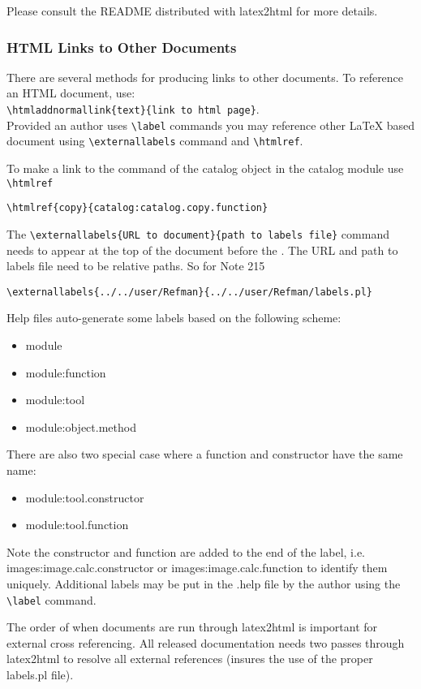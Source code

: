 Please consult the README distributed with latex2html for more details.

\subsubsection{HTML Links to Other Documents}
There are several methods for producing links to other documents.  To
reference an HTML document, use:\\
\verb!\htmladdnormallink{text}{link to html page}!.\\
Provided an author uses
\verb!\label! commands you may reference other 
LaTeX based document using 
\verb!\externallabels! command and \verb!\htmlref!.

To make a link to the  command of the
catalog object in the catalog module use \verb!\htmlref!
\begin{verbatim}
\htmlref{copy}{catalog:catalog.copy.function}
\end{verbatim}

The \verb!\externallabels{URL to document}{path to labels file}! command
needs to appear at the top of the document before the \verb!!. 
The URL and path to labels file need to be relative paths.  So for Note 215
\begin{verbatim}
\externallabels{../../user/Refman}{../../user/Refman/labels.pl}
\end{verbatim}

Help files auto-generate some labels based on the following scheme:
\begin{itemize}
\item module
\item module:function
\item module:tool
\item module:object.method
\end{itemize}
There are also two special case where a function and constructor have the
same name:
\begin{itemize}
\item module:tool.constructor
\item module:tool.function
\end{itemize}
Note the constructor and function are added to the end of the label, i.e.
images:image.calc.constructor or images:image.calc.function to identify them
uniquely.
Additional labels may be put in the .help file by the author using the 
\verb!\label! command.

The order of when documents are run through latex2html is important
for external cross referencing. All released 
documentation needs two passes through latex2html to resolve all 
external references (insures the use of the proper labels.pl file).  

